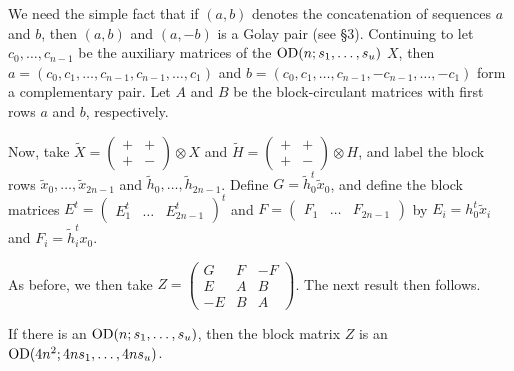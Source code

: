 \documentclass[../../../main]{subfiles}
\begin{document}
 We need the simple fact that if $(a,b)$ denotes the concatenation of sequences $a$ and $b$, then $(a,b)$ and $(a,-b)$ is a Golay pair (see \S3). Continuing to let $c_0, \dots, c_{n-1}$ be the auxiliary matrices of the $\text{OD}(n; s_1, \dots, s_u)$ $X$, then $a=(c_0,c_1, \dots, c_{n-1},c_{n-1},\dots,c_1)$ and $b=(c_0,c_1, \dots, c_{n-1},-c_{n-1},\dots,-c_1)$ form a complementary pair. Let $A$ and $B$ be the block-circulant matrices with first rows $a$ and $b$, respectively. 
 
 Now, take $\tilde X = \left(\begin{smallmatrix} +&+\\+&- \end{smallmatrix}\right) \otimes X$ and $\tilde H = \left(\begin{smallmatrix} +&+\\+&- \end{smallmatrix}\right) \otimes H$, and label the block rows $\tilde x_0, \dots, \tilde x_{2n-1}$ and $\tilde h_0, \dots, \tilde h_{2n-1}$. Define $G=\tilde h_0^t \tilde x_0$, and define the block matrices $E^t=(\begin{smallmatrix} E_1^t & \dots & E_{2n-1}^t \end{smallmatrix})^t$ and $F=(\begin{smallmatrix} F_1 & \dots & F_{2n-1} \end{smallmatrix})$ by $E_i=h_0^t\tilde x_i$ and $F_i=\tilde h_i^t x_0$.
 
 As before, we then take $Z=\left(\begin{smallmatrix} G&F&-F\\E&A&B\\-E&B&A \end{smallmatrix}\right)$. The next result then follows.
 
 \begin{thm}\label{stable-od-thm}
  If there is an $\text{OD}(n;s_1, \dots, s_u)$, then the block matrix $Z$ is an $\text{OD}(4n^2; 4ns_1, \dots, 4ns_u)$. 
 \end{thm}
 
\end{document}
